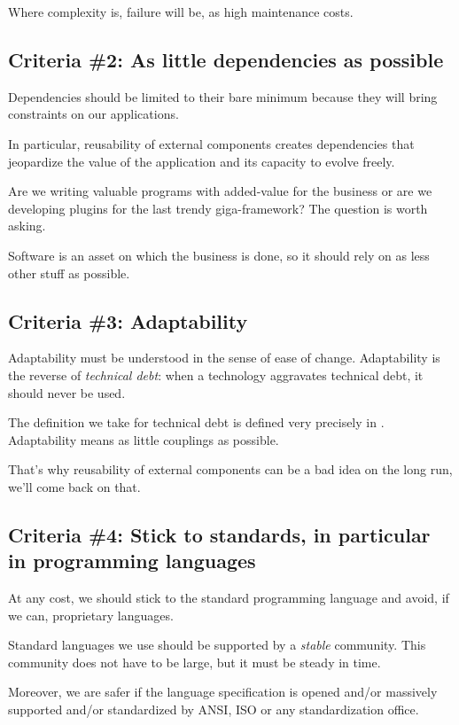 \documentclass[]{article}
\begin{document}
Where complexity is, failure will be, as high maintenance costs.

\subsection{Criteria \#2: As little dependencies as possible}

Dependencies should be limited to their bare minimum because they will bring constraints on our applications.

In particular, reusability of external components creates dependencies that jeopardize the value of the application and its capacity to evolve freely.

Are we writing valuable programs with added-value for the business or are we developing plugins for the last trendy giga-framework? The question is worth asking.

Software is an asset on which the business is done, so it should rely on as less other stuff as possible.

\subsection{Criteria \#3: Adaptability}

Adaptability must be understood in the sense of ease of change. Adaptability is the reverse of \emph{technical debt}: when a technology aggravates technical debt, it should never be used.

The definition we take for technical debt is defined very precisely in \cite{gop}. Adaptability means as little couplings as possible.

That's why reusability of external components can be a bad idea on the long run, we'll come back on that.

\subsection{Criteria \#4: Stick to standards, in particular in programming languages}

At any cost, we should stick to the standard programming language and avoid, if we can, proprietary languages.

Standard languages we use should be supported by a \emph{stable} community. This community does not have to be large, but it must be steady in time.

Moreover, we are safer if the language specification is opened and/or massively supported and/or standardized by ANSI, ISO or any standardization office.
\end{document}
